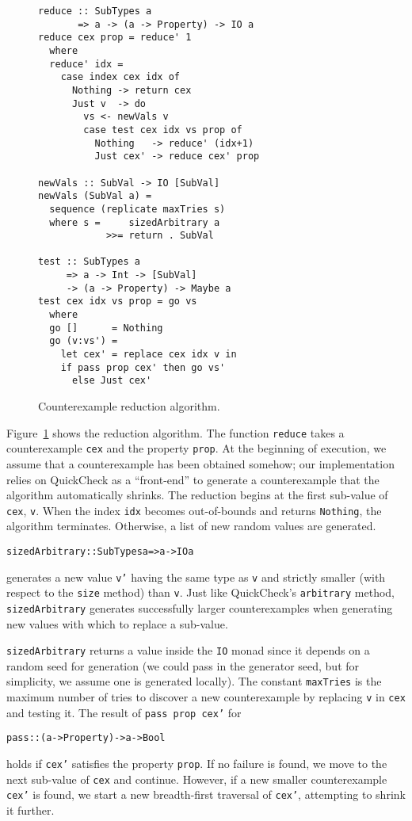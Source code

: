 \documentclass[10pt]{sigplanconf}
\newenvironment{code}{\begin{alltt}}{\end{alltt}}
\newcommand{\ttp}[1]{\texttt{#1}}
\begin{document}
\begin{figure}[ht]
  \begin{lstlisting}
reduce :: SubTypes a 
       => a -> (a -> Property) -> IO a
reduce cex prop = reduce' 1
  where
  reduce' idx =
    case index cex idx of 
      Nothing -> return cex
      Just v  -> do
        vs <- newVals v
        case test cex idx vs prop of
          Nothing   -> reduce' (idx+1)
          Just cex' -> reduce cex' prop

newVals :: SubVal -> IO [SubVal]
newVals (SubVal a) = 
  sequence (replicate maxTries s)
  where s =     sizedArbitrary a 
            >>= return . SubVal

test :: SubTypes a 
     => a -> Int -> [SubVal] 
     -> (a -> Property) -> Maybe a
test cex idx vs prop = go vs
  where
  go []      = Nothing
  go (v:vs') = 
    let cex' = replace cex idx v in
    if pass prop cex' then go vs' 
      else Just cex'
  \end{lstlisting}
  \caption{Counterexample reduction algorithm.\label{fig:reduction}}
\end{figure}

Figure~\ref{fig:reduction} shows the reduction algorithm.  The function
\ttp{reduce} takes a counterexample \ttp{cex} and the property \ttp{prop}.  At
the beginning of execution, we assume that a counterexample has been obtained
somehow; our implementation relies on QuickCheck as a ``front-end'' to generate
a counterexample that the algorithm automatically shrinks.  The reduction begins
at the first sub-value of \ttp{cex}, \ttp{v}.  When the index \ttp{idx} becomes
out-of-bounds and returns \ttp{Nothing}, the algorithm terminates.  Otherwise, a
list of new random values are generated.
%
\begin{code}
sizedArbitrary :: SubTypes a => a -> IO a  
\end{code}
%
\noindent
generates a new value \ttp{v'} having the same type as \ttp{v} and strictly
smaller (with respect to the \ttp{size} method) than \ttp{v}.  Just like
QuickCheck's \ttp{arbitrary} method, \ttp{sizedArbitrary} generates successfully
larger counterexamples when generating new values with which to replace a
sub-value.

\ttp{sizedArbitrary} returns a value inside the \ttp{IO} monad since it depends
on a random seed for generation (we could pass in the generator seed, but for
simplicity, we assume one is generated locally).  The constant \ttp{maxTries} is
the maximum number of tries to discover a new counterexample by replacing
\ttp{v} in \ttp{cex} and testing it.  The result of \ttp{pass prop cex'} for
%
\begin{code}
pass :: (a -> Property) -> a -> Bool
\end{code}
%
\noindent
holds if \ttp{cex'} satisfies the property \ttp{prop}.  If no failure is found,
we move to the next sub-value of \ttp{cex} and continue.  However, if a new
smaller counterexample \ttp{cex'} is found, we start a new breadth-first
traversal of \ttp{cex'}, attempting to shrink it further.
\end{document}
